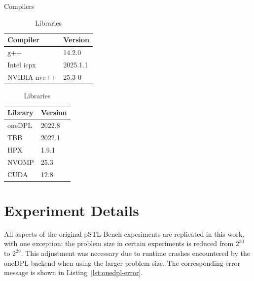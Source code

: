 \documentclass[sigconf]{acmart}
\begin{document}
\begin{table}[h]
      \centering
      \begin{minipage}[t]{0.48\linewidth}
            \centering
            \caption{Compilers}\label{tab:compilers}
            \begin{tabular}{|l|l|}
                  \hline
                  \textbf{Compiler} & \textbf{Version} \\
                  \hline
                  g++               & 14.2.0           \\
                  Intel icpx        & 2025.1.1         \\
                  NVIDIA nvc++      & 25.3-0           \\
                  \hline
            \end{tabular}
      \end{minipage}
      \hfill
      \begin{minipage}[t]{0.48\linewidth}
            \centering
            \caption{Libraries}\label{tab:libraries}
            \begin{tabular}{|l|l|}
                  \hline
                  \textbf{Library} & \textbf{Version} \\
                  \hline
                  oneDPL           & 2022.8           \\
                  TBB              & 2022.1           \\
                  HPX              & 1.9.1            \\
                  NVOMP            & 25.3             \\
                  CUDA             & 12.8             \\
                  \hline
            \end{tabular}
      \end{minipage}
\end{table}

\section{Experiment Details}\label{sec:exp_details}
All aspects of the original pSTL-Bench experiments are replicated in this work,
with one exception: the problem size in certain experiments is reduced from
$2^{30}$ to $2^{29}$. This adjustment was necessary due to runtime crashes
encountered by the oneDPL backend when using the larger problem size. The
corresponding error message is shown in Listing~\ref{lst:onedpl-error}.
\end{document}
